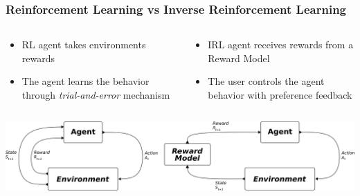 
\begin{frame}
	\frametitle{Reinforcement Learning vs Inverse Reinforcement Learning}
	
 	\begin{columns}
		\begin{column}{0.5\textwidth}
			
			\begin{itemize}
				\item RL agent takes environments rewards
				\item The agent learns the behavior through \textit{trial-and-error} mechanism
			\end{itemize}
			
		\end{column}
		\begin{column}{0.5\textwidth}
			\begin{itemize}
				\item IRL agent receives rewards from a Reward Model
				\item The user controls the agent behavior with preference feedback 
			\end{itemize}			
		\end{column}
		
	\end{columns}
	\vspace{1cm}
	\centering
	\includegraphics[width=1\linewidth]{images/IRL+RL.png}

\end{frame}

